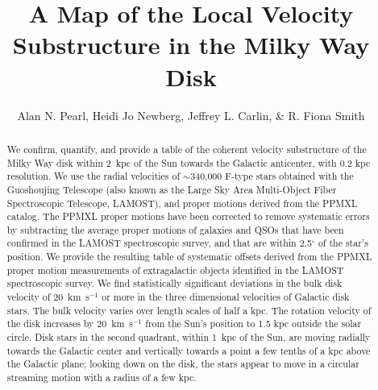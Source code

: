 \documentclass[11pt,preprint]{aastex6}
\begin{document}
\title{A Map of the Local Velocity Substructure in the Milky Way Disk}


\author{
	Alan N. Pearl, 
	Heidi Jo Newberg, 
	Jeffrey L. Carlin, 
	\& R. Fiona Smith
}



\begin{abstract}

We confirm, quantify, and provide a table of the coherent velocity substructure of the Milky Way disk within 2~kpc of the Sun towards the Galactic anticenter, with 0.2 kpc resolution.
We use the radial velocities of $\sim$340,000 F-type stars obtained with the Guoshoujing Telescope (also known as the Large Sky Area Multi-Object Fiber Spectroscopic Telescope, LAMOST), and proper motions derived from the PPMXL catalog.
The PPMXL proper motions have been corrected to remove systematic errors by subtracting the average proper motions of galaxies and QSOs that have been confirmed in the LAMOST spectroscopic survey, and that are within 2.5$^{\circ}$ of the star's position.
We provide the resulting table of systematic offsets derived from the PPMXL proper motion measurements of extragalactic objects identified in the LAMOST spectroscopic survey.
We find statistically significant deviations in the bulk disk velocity of 20~km~s$^{-1}$ or more in the three dimensional velocities of Galactic disk stars.  The bulk velocity varies over length scales of half a kpc.  The rotation velocity of the disk increases by 20~km~s$^{-1}$ from the Sun's position to 1.5 kpc outside the solar circle.  Disk stars in the second quadrant, within 1~kpc of the Sun, are moving radially towards the Galactic center and vertically towards a point a few tenths of a kpc above the Galactic plane; looking down on the disk, the stars appear to move in a circular streaming motion with a radius of a few kpc.

\end{abstract}

\end{document}

